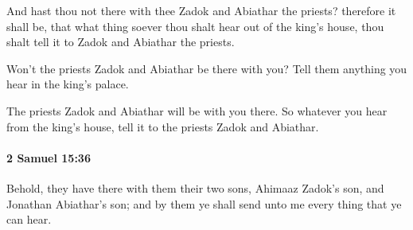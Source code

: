 			\begin{versebox}
					\item[BHS] 
					\item[ASV] And hast thou not there with thee Zadok and Abiathar the priests? therefore it shall be, that what thing soever thou shalt hear out of the king's house, thou shalt tell it to Zadok and Abiathar the priests.
					\item[NIV] Won’t the priests Zadok and Abiathar be there with you? Tell them anything you hear in the king’s palace.
					\item[NRSV] The priests Zadok and Abiathar will be with you there. So whatever you hear from the king’s house, tell it to the priests Zadok and Abiathar.
			\end{versebox}

		\paragraph{2 Samuel 15:36} %
			\label{2SAMUEL-15-36}

			Behold, they have there with them their two sons, Ahimaaz Zadok’s son, and Jonathan Abiathar’s son; and by them ye shall send unto me every thing that ye can hear.


